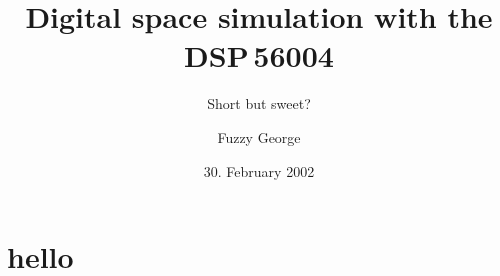 \documentclass[toc=listof]{scrreprt}
\begin{document}
\titlehead{{\Large Unseen University
\hfill SS~2002\\}
Higher Analytical Institute\\ Mythological Rd\\
34567 Etherworld}
\subject{Dissertation}
\title{Digital space simulation with the DSP\,56004} \subtitle{Short but sweet?}
\author{Fuzzy George}
\date{30. February 2002}
\publishers{Adviser Prof. John Eccentric Doe} 
\maketitle
\tableofcontents
\section{hello}
\end{document}
